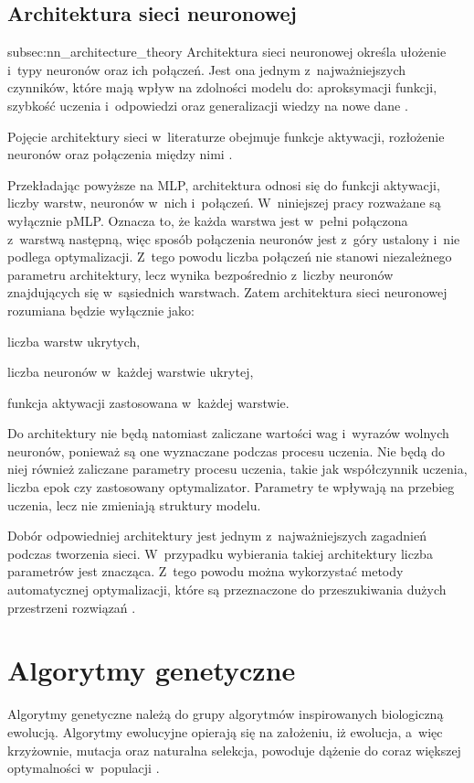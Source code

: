 \toclesslabel\subsection{Architektura sieci neuronowej}{subsec:nn_architecture_theory}
Architektura sieci neuronowej określa
ułożenie i~typy neuronów oraz ich połączeń.
Jest ona jednym z~najważniejszych czynników,
które mają wpływ na zdolności modelu do:
aproksymacji funkcji,
szybkość uczenia i~odpowiedzi
oraz generalizacji wiedzy na nowe dane%
.

Pojęcie architektury sieci w~literaturze
obejmuje funkcje aktywacji, rozłożenie neuronów
oraz połączenia między nimi%
.

Przekładając powyższe na \gls{MLP}, architektura
odnosi się do funkcji aktywacji, liczby warstw,
neuronów w~nich i~połączeń.
W~niniejszej pracy rozważane
są wyłącznie \gls{pMLP}.
Oznacza to, że każda warstwa jest
w~pełni połączona z~warstwą następną,
więc sposób połączenia neuronów jest
z~góry ustalony i~nie podlega optymalizacji.
Z~tego powodu liczba połączeń nie stanowi
niezależnego parametru architektury,
lecz wynika bezpośrednio z~liczby neuronów
znajdujących się w~sąsiednich warstwach.
Zatem architektura sieci neuronowej
rozumiana będzie wyłącznie jako:
\begin{nospitemize}
  \item liczba warstw ukrytych,
  \item liczba neuronów w~każdej warstwie ukrytej,
  \item funkcja aktywacji zastosowana w~każdej warstwie.
\end{nospitemize}

Do architektury nie będą natomiast zaliczane
wartości wag i~wyrazów wolnych neuronów,
ponieważ są one wyznaczane podczas procesu uczenia.
Nie będą do niej również zaliczane parametry procesu
uczenia, takie jak współczynnik uczenia,
liczba epok czy zastosowany optymalizator.
Parametry te wpływają na przebieg uczenia,
lecz nie zmieniają struktury modelu.

Dobór odpowiedniej architektury
jest jednym z~najważniejszych zagadnień
podczas tworzenia sieci.
W~przypadku wybierania takiej architektury 
liczba parametrów jest znacząca.
Z~tego powodu można wykorzystać metody
automatycznej optymalizacji, które są przeznaczone
do przeszukiwania dużych przestrzeni rozwiązań%
.

\section{Algorytmy genetyczne}
Algorytmy genetyczne należą do grupy
algorytmów inspirowanych biologiczną ewolucją.
Algorytmy ewolucyjne opierają się na założeniu,
iż ewolucja, a~więc krzyżownie, mutacja
oraz naturalna selekcja, powoduje dążenie
do coraz większej optymalności w~populacji%
.

